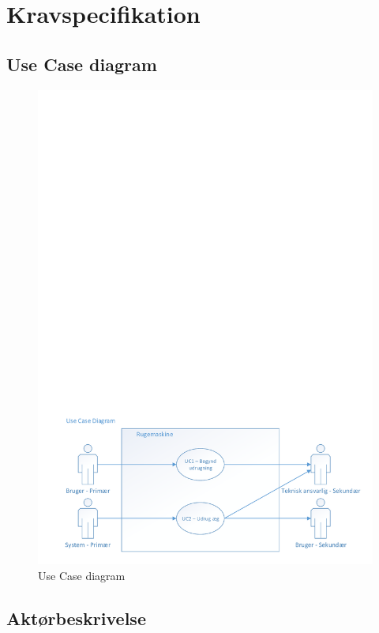 \chapter{Kravspecifikation}

\section{Use Case diagram}

\begin{figure}[h]
\centering
\includegraphics[width=16cm, scale=1, trim= 0mm 0mm 0mm 200mm, clip=true,  angle=0]{1_kravspecifikation/diagrammer/UseCase_Generel_v1.pdf}
\caption{Use Case diagram}
\label{fig:usecase_diagram}
\end{figure}

\clearpage
\section{Aktørbeskrivelse}



\clearpage

